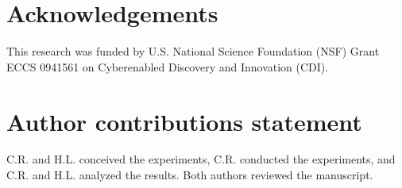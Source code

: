 \documentclass[fleqn,10pt]{wlscirep}
\begin{document}



%

\section*{Acknowledgements}


This research was funded by U.S. National Science Foundation (NSF) Grant ECCS 0941561 on
Cyberenabled Discovery and Innovation (CDI).

\section*{Author contributions statement}


C.R. and H.L. conceived the experiments, C.R. conducted the experiments, and C.R. and H.L. analyzed
the results. Both authors reviewed the manuscript.
\end{document}
